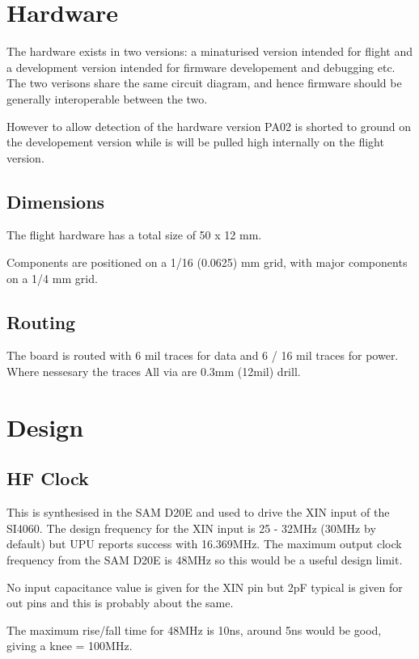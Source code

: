 \documentclass[12pt]{article}
\begin{document}
\section{Hardware}

The hardware exists in two versions: a minaturised version intended
for flight and a development version intended for firmware
developement and debugging etc. The two verisons share the same
circuit diagram, and hence firmware should be generally interoperable
between the two.

However to allow detection of the hardware version PA02 is shorted to
ground on the developement version while is will be pulled high
internally on the flight version.

\subsection{Dimensions}

The flight hardware has a total size of 50 x 12 mm.

Components are positioned on a 1/16 (0.0625) mm grid, with major
components on a 1/4 mm grid.

\subsection{Routing}

The board is routed with 6 mil traces for data and 6 / 16 mil traces
for power. Where nessesary the traces  All via are 0.3mm (12mil) drill.

\section{Design}

\subsection{HF Clock}

This is synthesised in the SAM D20E and used to drive the XIN input of
the SI4060. The design frequency for the XIN input is 25 - 32MHz
(30MHz by default) but UPU reports success with 16.369MHz. The maximum
output clock frequency from the SAM D20E is 48MHz so this would be a
useful design limit.

No input capacitance value is given for the XIN pin but 2pF typical is
given for out pins and this is probably about the same.

The maximum rise/fall time for 48MHz is 10ns, around 5ns would be
good, giving a knee = 100MHz.
\end{document}
